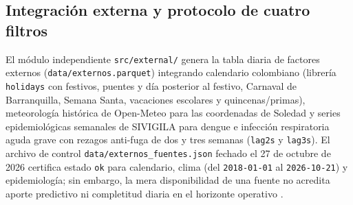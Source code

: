 \subsection{Integración externa y protocolo de cuatro filtros}

El módulo independiente \texttt{src/external/} genera la tabla diaria de factores externos (\texttt{data/externos.parquet}) integrando calendario colombiano (librería \texttt{holidays} con festivos, puentes y día posterior al festivo, Carnaval de Barranquilla, Semana Santa, vacaciones escolares y quincenas/primas), meteorología histórica de Open-Meteo para las coordenadas de Soledad y series epidemiológicas semanales de SIVIGILA para dengue e infección respiratoria aguda grave con rezagos anti-fuga de dos y tres semanas (\texttt{lag2s} y \texttt{lag3s}). El archivo de control \texttt{data/externos\_fuentes.json} fechado el 27 de octubre de 2026 certifica estado \texttt{ok} para calendario, clima (del \texttt{2018-01-01} al \texttt{2026-10-21}) y epidemiología; sin embargo, la mera disponibilidad de una fuente no acredita aporte predictivo ni completitud diaria en el horizonte operativo \parencite{mediflow2026informe}.

